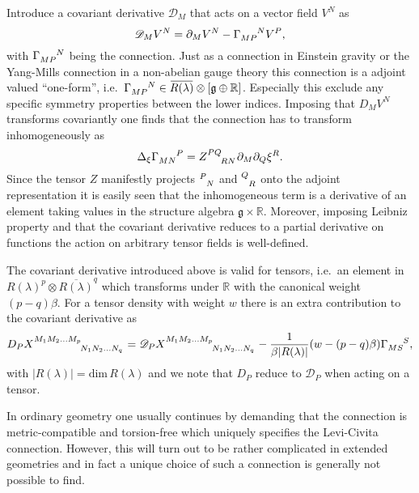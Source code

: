 Introduce a covariant derivative $\mathscr{D}_M$ that acts on a vector field $V^N$ as  
\begin{equation}
    \mathscr{D}_MV^N = \pd_M V^N-\tensor{\Gamma}{_{MP}^N}V^P,
\end{equation}
with $\tensor{\Gamma}{_{MP}^N}$ being the connection. Just as a connection in Einstein gravity or the Yang-Mills connection in a non-abelian gauge theory this connection is a adjoint valued ``one-form'', i.e.\ $\tensor{\Gamma}{_{MP}^N}\in \overbar{R(\lambda)}\otimes\left[\mathfrak{g}\oplus\mathbb{R}\right]$. Especially this exclude any specific symmetry properties between the lower indices. Imposing that $D_MV^N$ transforms covariantly one finds that the connection has to transform inhomogeneously as 
\begin{equation}\label{eq:InHomoConnection}
    \Delta_\xi \tensor{\Gamma}{_{MN}^P} = \tensor{Z}{^{PQ}_{RN}}\pd_M\pd_Q\xi^R. 
\end{equation}
Since the tensor $Z$ manifestly projects $\tensor{}{^P_N}$ and $\tensor{}{^Q_R}$ onto the adjoint representation it is easily seen that the inhomogeneous term is a derivative of an element taking values in the structure algebra $\mathfrak{g}\times\mathbb{R}$. Moreover, imposing Leibniz property and that the covariant derivative reduces to a partial derivative on functions the action on arbitrary tensor fields is well-defined. 

The covariant derivative introduced above is valid for tensors, i.e.\ an element in $R(\lambda)^p\otimes \overbar{R(\lambda)}^q$ which transforms under $\mathbb{R}$ with the canonical weight $(p-q)\beta$. For a tensor density with weight $w$ there is an extra contribution to the covariant derivative as 
\begin{equation}
    D_P \tensor{X}{^{M_1M_2\ldots M_p}_{N_1N_2\ldots N_q}} = \mathscr{D}_P\tensor{X}{^{M_1M_2\ldots M_p}_{N_1N_2\ldots N_q}}-\frac{1}{\beta |R(\lambda)|}(w-(p-q)\beta)\tensor{\Gamma}{_{MS}^S},
\end{equation}
with $|R(\lambda)|=\text{dim}\,R(\lambda)$ and we note that $D_P$ reduce to $\mathscr{D}_P$ when acting on a tensor.


In ordinary geometry one usually continues by demanding that the connection is metric-compatible and torsion-free which uniquely specifies the Levi-Civita connection. However, this will turn out to be rather complicated in extended geometries and in fact a unique choice of such a connection is generally not possible to find. 


